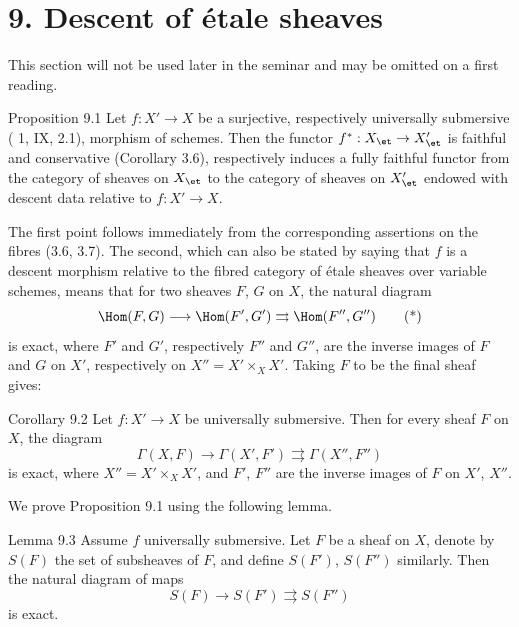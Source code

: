 \section*{9. Descent of \'etale sheaves}

This section will not be used later in the seminar and may be omitted on a first reading.

\begin{statement}{Proposition 9.1}
Let \(f:X'\to X\) be a surjective, respectively universally submersive (\SGA{} 1, IX, 2.1), morphism of schemes. Then the functor \(f^*:X_{\et}\to X'_{\et}\) is faithful and conservative (\cf Corollary 3.6), respectively induces a fully faithful functor from the category of sheaves on \(X_{\et}\) to the category of sheaves on \(X'_{\et}\) endowed with descent data relative to \(f:X'\to X\).
\end{statement}

The first point follows immediately from the corresponding assertions on the fibres (3.6, 3.7). The second, which can also be stated by saying that \(f\) is a descent morphism relative to the fibred category of \'etale sheaves over variable schemes, means that for two sheaves \(F\), \(G\) on \(X\), the natural diagram
\[
\Hom(F,G)\longrightarrow\Hom(F',G')\rightrightarrows\Hom(F'',G'')
\tag{*}
\]
is exact, where \(F'\) and \(G'\), respectively \(F''\) and \(G''\), are the inverse images of \(F\) and \(G\) on \(X'\), respectively on \(X''=X'\times_XX'\). Taking \(F\) to be the final sheaf gives:

\begin{statement}{Corollary 9.2}
Let \(f:X'\to X\) be universally submersive. Then for every sheaf \(F\) on \(X\), the diagram
\[
\Gamma(X,F)\longrightarrow\Gamma(X',F')\rightrightarrows\Gamma(X'',F'')
\]
is exact, where \(X''=X'\times_XX'\), and \(F'\), \(F''\) are the inverse images of \(F\) on \(X'\), \(X''\).
\end{statement}

We prove Proposition 9.1 using the following lemma.

\begin{statement}{Lemma 9.3}
Assume \(f\) universally submersive. Let \(F\) be a sheaf on \(X\), denote by \(S(F)\) the set of subsheaves of \(F\), and define \(S(F')\), \(S(F'')\) similarly. Then the natural diagram of maps
\[
S(F)\longrightarrow S(F')\rightrightarrows S(F'')
\]
is exact.
\end{statement}

